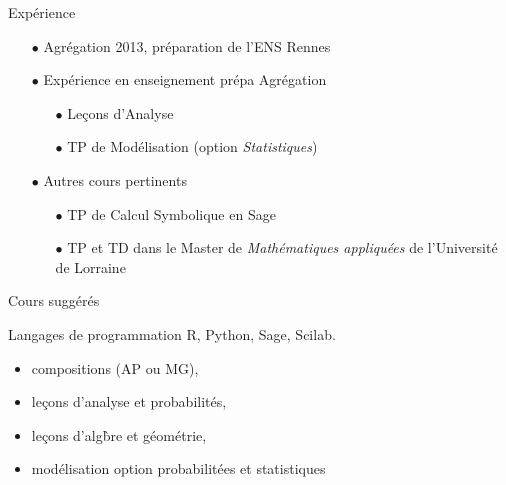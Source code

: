 \begin{frame}{Exp\'erience}

\begin{itemize}
\item[$\bullet$] Agr\'egation 2013, pr\'eparation de l'ENS Rennes
\vfill
\item[$\bullet$] Exp\'erience en enseignement pr\'epa Agr\'egation
\vfill
\begin{itemize}
\item[$\bullet$] Le\c{c}ons d'Analyse 
\vfill
\item[$\bullet$] TP de Mod\'elisation (option \textit{Statistiques}) 
\vfill
\end{itemize}
\item[$\bullet$] Autres cours pertinents
\vfill
\begin{itemize}
\item[$\bullet$] TP de Calcul Symbolique en Sage 
\vfill
\item[$\bullet$] TP et TD dans le Master de \textit{Math\'ematiques appliqu\'ees} de l'Universit\'e de Lorraine 
\vfill
\end{itemize}
\end{itemize}

\end{frame}

\begin{frame}{Cours sugg\'er\'es}
\begin{block}{Langages de programmation}
R, Python, Sage, Scilab.
\end{block}
\vfill
\begin{itemize}
\item compositions (AP ou MG),
\vfill
\item le\c{c}ons d'analyse et probabilit\'es,
\vfill
\item le\c{c}ons d'alg\`bre et g\'eom\'etrie,
\vfill
\item mod\'elisation option probabilit\'ees et statistiques
\end{itemize}
\vfill
\end{frame}